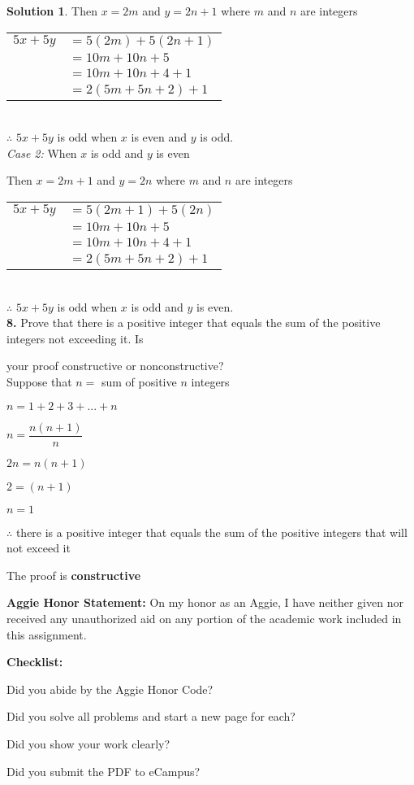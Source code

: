 \documentclass{article}
\theoremstyle{definition}
\newtheorem*{solution}{Solution}
\newcommand{\honor}{\noindent \textbf{Aggie Honor Statement: }On my honor as an Aggie, I have neither
  given nor received any unauthorized aid on any portion of the academic work included in this assignment.
}
\newcommand{\checklist}{\noindent\textbf{Checklist:}
\begin{compactenum}
\item Did you abide by the Aggie Honor Code?
\item Did you solve all problems and start a new page for each?
\item Did you show your work clearly?
\item Did you submit the PDF to eCampus?
\end{compactenum}
}
\begin{document}
\begin{solution}
Then $x = 2m$ and $y = 2n+1$ where $m$ and $n$ are integers

\begin{tabular}{ll}
$5x + 5y$ & $= 5(2m) + 5(2n+1)$ \\
          & $= 10m + 10n + 5$ \\
          & $= 10m + 10n + 4 + 1$ \\
          & $= 2(5m + 5n + 2) + 1$ \\
\end{tabular} \\


$\therefore$ $5x + 5y$ is odd when $x$ is even and $y$ is odd.\\



\textit{Case 2:} When $x$ is odd and $y$ is even


Then $x = 2m +1$ and $y = 2n$ where $m$ and $n$ are integers

\begin{tabular}{ll}
$5x + 5y$ & $= 5(2m+1) + 5(2n)$ \\
          & $= 10m + 10n + 5$ \\
          & $= 10m + 10n + 4 + 1$ \\
          & $= 2(5m + 5n + 2) + 1$ \\
\end{tabular} \\


$\therefore$ $5x + 5y$ is odd when $x$ is odd and $y$ is even.\\


\textbf{8.} Prove that there is a positive integer that equals the sum of the positive integers not exceeding it. Is


your proof constructive or nonconstructive?\\


Suppose that $n=$ sum of positive $n$ integers


$n = 1 + 2 + 3 + ... + n$


$n = \dfrac{n(n+1)}{n}$


$2n = n(n+1)$


$2 = (n+1)$


$n = 1$


$\therefore$ there is a positive integer that equals the sum of the positive integers that will not exceed it


The proof is \bf constructive





\end{solution}

\newpage


\bigskip
\honor

\bigskip
\checklist
\end{document}
